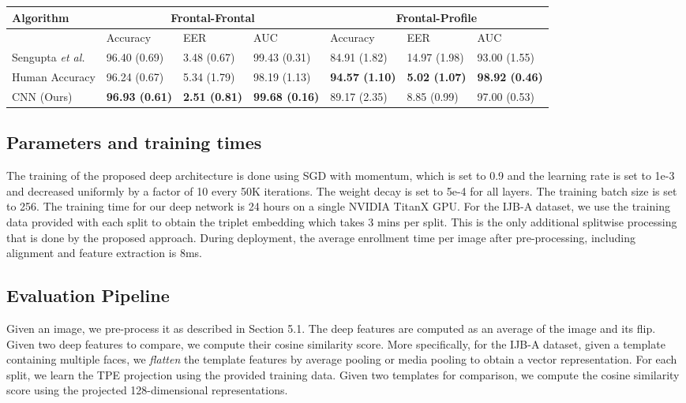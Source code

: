 \documentclass[10pt,twocolumn,letterpaper]{article}
\begin{document}
\begin{table*}
\centering
  \begin{tabular}{|l|l|l|l|l|l|l|}
    \hline
    \multirow{3}{*}{Algorithm} &
      \multicolumn{3}{c|}{Frontal-Frontal} &       
      \multicolumn{3}{c|}{Frontal-Profile} 
       \\
       \hline
    & Accuracy & EER & AUC & Accuracy & EER & AUC \\
    \hline
    Sengupta \emph{et al.} \cite{cfpw} &  96.40 (0.69) & 3.48 (0.67) & 99.43 (0.31) & 84.91 (1.82) & 14.97 (1.98) & 93.00 (1.55)\\
    \hline
    Human Accuracy & 96.24 (0.67) & 5.34 (1.79)& 98.19 (1.13) & \textbf{94.57 (1.10)} & \textbf{5.02 (1.07)} & \textbf{98.92 (0.46)}  \\
    \hline
    CNN (Ours) & \textbf{96.93 (0.61)} & \textbf{2.51 (0.81)} & \textbf{99.68 (0.16)} & 89.17 (2.35) & 8.85 (0.99) & 97.00 (0.53) \\
    \hline
  \end{tabular}
  
\label{cfpw-results}
\end{table*}

\subsection{Parameters and training times}
The training of the proposed deep architecture is done using SGD with momentum,
which is set to 0.9 and the learning rate is set to 1e-3 and decreased uniformly
by a factor of 10 every 50K iterations. The weight decay is set to 5e-4 for all
layers. The training batch size is set to 256. The training time for our deep
network is 24 hours on a single NVIDIA TitanX GPU. For the IJB-A dataset, we use
the training data provided with each split to obtain the triplet embedding which
takes 3 mins per split. This is the only additional splitwise processing that is
done by the proposed approach. During deployment, the average enrollment time per
image after pre-processing, including alignment and feature extraction is 8ms. 

\subsection{Evaluation Pipeline}
Given an image, we pre-process it as described in Section 5.1.  The deep
features are computed as an average of the image and its flip. Given two deep features to compare, we compute their cosine similarity score. More specifically,
for the IJB-A dataset, given a template containing multiple faces, we
\textit{flatten} the template features by average pooling or media pooling to
obtain a vector representation. For each split, we learn the TPE projection
using the provided training data. Given two templates for comparison, we compute the cosine similarity
score using the projected 128-dimensional representations. 
\end{document}
